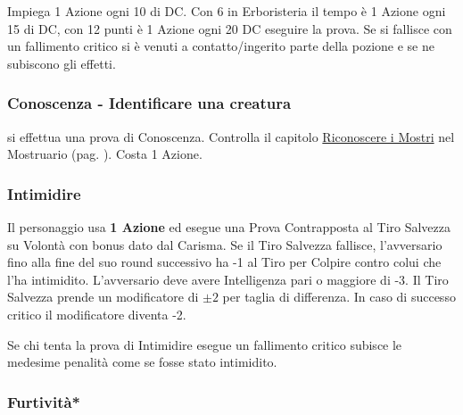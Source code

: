 \begin{multicols}{2}
Impiega 1 Azione ogni 10 di DC. Con 6 in Erboristeria il tempo è 1 Azione ogni 15 di DC, con 12 punti è 1 Azione ogni 20 DC eseguire la prova. Se si fallisce con un fallimento critico si è venuti a contatto/ingerito parte della pozione e se ne subiscono gli effetti.

\titlespacing*{\subsubsection}{0pt}{0.5em}{0.5em}\subsubsection*{Conoscenza - Identificare una creatura} \label{riconosceremostro}\hypertarget{riconosceremostro}{}
si effettua una prova di Conoscenza. Controlla il capitolo \hyperlink{riconoscereimostri}{Riconoscere i Mostri} nel Mostruario (pag. \pageref{riconoscereimostri}). Costa 1 Azione.

\titlespacing*{\subsubsection}{0pt}{0.5em}{0.5em}\subsubsection*{Intimidire}\label{intimidire}
Il personaggio usa \textbf{1 Azione} ed esegue una Prova Contrapposta al Tiro Salvezza su Volontà con bonus dato dal Carisma.
Se il Tiro Salvezza fallisce, l'avversario fino alla fine del suo round successivo ha -1 al Tiro per Colpire contro colui che l'ha intimidito. L'avversario deve avere Intelligenza pari o maggiore di -3. Il Tiro Salvezza prende un modificatore di $\pm2$ per taglia di differenza. In caso di successo critico il modificatore diventa -2.

Se chi tenta la prova di Intimidire esegue un fallimento critico subisce le medesime penalità come se fosse stato intimidito.



%

\titlespacing*{\subsubsection}{0pt}{0.5em}{0.5em}\subsubsection*{Furtività*}  \label{furtivita}


\end{multicols}
